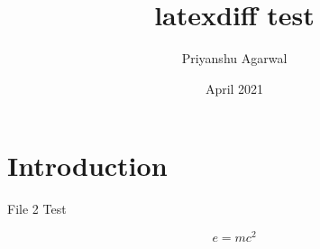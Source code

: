 \documentclass{article}
\title{latexdiff test}
\author{Priyanshu Agarwal}
\date{April 2021}
\begin{document}
\maketitle

\section{Introduction}

File 2
Test

\begin{equation}
    e = mc^2
\end{equation}
\end{document}

